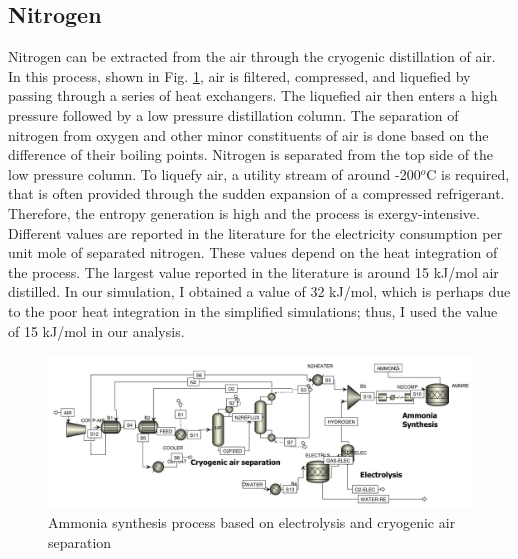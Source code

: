 \documentclass{ECOS_2021}
\begin{document}
\sffamily \subsection{Nitrogen}
\normalsize
Nitrogen can be extracted from the air through the cryogenic distillation
of air. In this process, shown in Fig. \ref{fig:Ammonia-synthesis-cryogenic},
air is filtered, compressed, and liquefied by passing through a series
of heat exchangers. The liquefied air then enters a high pressure
followed by a low pressure distillation column. The separation of
nitrogen from oxygen and other minor constituents of air is done based
on the difference of their boiling points. Nitrogen is separated from
the top side of the low pressure column. To liquefy air, a utility
stream of around -200$^{o}$C is required, that is often provided
through the sudden expansion of a compressed refrigerant. Therefore,
the entropy generation is high and the process is exergy-intensive.
Different values are reported in the literature for the electricity
consumption per unit mole of separated nitrogen. These values depend
on the heat integration of the process. The largest value reported
in the literature is around 15 kJ/mol air distilled. In our simulation,
I obtained a value of 32 kJ/mol, which is perhaps due to the poor
heat integration in the simplified simulations; thus, I used the
value of 15 kJ/mol in our analysis.

\begin{figure}[H]
\centering
\includegraphics[width=14cm]{ammonia_cryogenic}

\caption{\label{fig:Ammonia-synthesis-cryogenic}Ammonia synthesis process
based on electrolysis and cryogenic air separation}
\end{figure}
\end{document}
